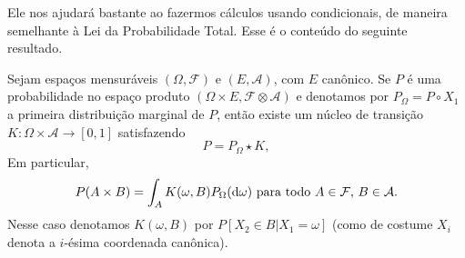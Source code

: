 \documentclass[../Notas_de_aula.tex]{subfiles}
\begin{document}
Ele nos ajudará bastante ao fazermos cálculos usando condicionais, de maneira semelhante à Lei da Probabilidade Total.
Esse é o conteúdo do seguinte resultado.

\begin{theorem} 
  \label{desintegracao}
  Sejam espaços mensuráveis $(\Omega, \mathcal{F})$ e $(E, \mathcal{A})$, com $E$ canônico.
  Se $P$ é uma probabilidade no espaço produto $(\Omega \times E, \mathcal{F} \otimes \mathcal{A})$ e denotamos por $P_\Omega = P \circ X_1$ a primeira distribuição marginal de $P$, então existe um núcleo de transição $K: \Omega \times \mathcal{A} \to [0,1]$ satisfazendo
  \begin{equation}
    P = P_\Omega \star K,
  \end{equation}
  Em particular,
  \begin{equation}
    \label{e:prob_cond_reg_prod}
    P(A \times B) = \int_A K(\omega, B) P_\Omega (\mathop{}\!\mathrm{d} \omega) \text{ para todo $A \in \mathcal{F}$, $B \in \mathcal{A}$}.
  \end{equation}
  Nesse caso denotamos $K(\omega, B)$ por $P[X_2 \in B | X_1 = \omega]$ (como de costume $X_i$ denota a $i$-ésima coordenada canônica).
\end{theorem}
\end{document}

